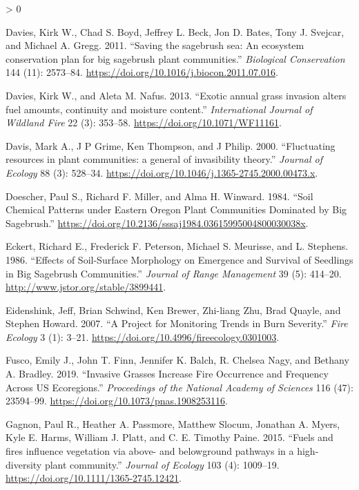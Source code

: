 \documentclass[
  12pt,
]{article}
\newlength{\cslhangindent}
\newenvironment{CSLReferences}[2] %
 {%
  \setlength{\parindent}{0pt}
  \ifodd #1 \everypar{\setlength{\hangindent}{\cslhangindent}}\ignorespaces\fi
  \ifnum #2 > 0
  \setlength{\parskip}{#2\baselineskip}
  \fi
 }%
 {}
\begin{document}
\begin{CSLReferences}{1}{0}
\leavevmode\hypertarget{ref-Davies2011}{}%
Davies, Kirk W., Chad S. Boyd, Jeffrey L. Beck, Jon D. Bates, Tony J.
Svejcar, and Michael A. Gregg. 2011. {``{Saving the sagebrush sea: An
ecosystem conservation plan for big sagebrush plant communities}.''}
\emph{Biological Conservation} 144 (11): 2573--84.
\url{https://doi.org/10.1016/j.biocon.2011.07.016}.

\leavevmode\hypertarget{ref-Davies2013}{}%
Davies, Kirk W., and Aleta M. Nafus. 2013. {``{Exotic annual grass
invasion alters fuel amounts, continuity and moisture content}.''}
\emph{International Journal of Wildland Fire} 22 (3): 353--58.
\url{https://doi.org/10.1071/WF11161}.

\leavevmode\hypertarget{ref-Davis2000}{}%
Davis, Mark A., J P Grime, Ken Thompson, and J Philip. 2000.
{``{Fluctuating resources in plant communities: a general of
invasibility theory}.''} \emph{Journal of Ecology} 88 (3): 528--34.
\url{https://doi.org/10.1046/j.1365-2745.2000.00473.x}.

\leavevmode\hypertarget{ref-Doescher1984}{}%
Doescher, Paul S., Richard F. Miller, and Alma H. Winward. 1984.
{``{Soil Chemical Patterns under Eastern Oregon Plant Communities
Dominated by Big Sagebrush}.''}
\url{https://doi.org/10.2136/sssaj1984.03615995004800030038x}.

\leavevmode\hypertarget{ref-Eckert1986}{}%
Eckert, Richard E., Frederick F. Peterson, Michael S. Meurisse, and L.
Stephens. 1986. {``{Effects of Soil-Surface Morphology on Emergence and
Survival of Seedlings in Big Sagebrush Communities}.''} \emph{Journal of
Range Management} 39 (5): 414--20.
\url{http://www.jstor.org/stable/3899441}.

\leavevmode\hypertarget{ref-Eidenshink2007}{}%
Eidenshink, Jeff, Brian Schwind, Ken Brewer, Zhi-liang Zhu, Brad Quayle,
and Stephen Howard. 2007. {``{A Project for Monitoring Trends in Burn
Severity}.''} \emph{Fire Ecology} 3 (1): 3--21.
\url{https://doi.org/10.4996/fireecology.0301003}.

\leavevmode\hypertarget{ref-Fusco2019}{}%
Fusco, Emily J., John T. Finn, Jennifer K. Balch, R. Chelsea Nagy, and
Bethany A. Bradley. 2019. {``Invasive Grasses Increase Fire Occurrence
and Frequency Across US Ecoregions.''} \emph{Proceedings of the National
Academy of Sciences} 116 (47): 23594--99.
\url{https://doi.org/10.1073/pnas.1908253116}.

\leavevmode\hypertarget{ref-Gagnon2015}{}%
Gagnon, Paul R., Heather A. Passmore, Matthew Slocum, Jonathan A. Myers,
Kyle E. Harms, William J. Platt, and C. E. Timothy Paine. 2015.
{``{Fuels and fires influence vegetation via above- and belowground
pathways in a high-diversity plant community}.''} \emph{Journal of
Ecology} 103 (4): 1009--19.
\url{https://doi.org/10.1111/1365-2745.12421}.


\end{CSLReferences}
\end{document}

